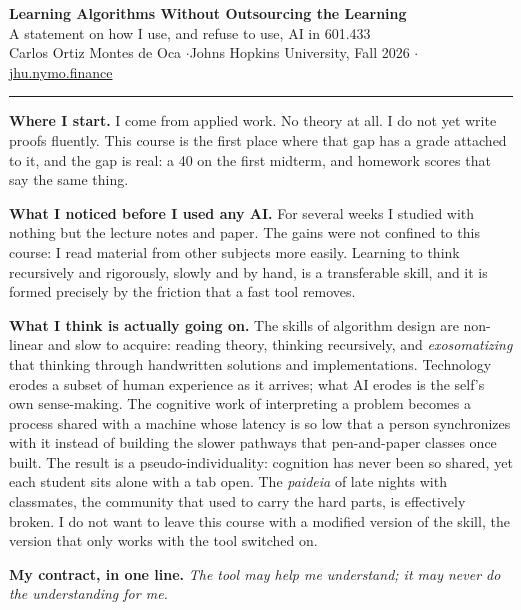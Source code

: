 \documentclass[10pt,letterpaper]{article}
\begin{document}
\begin{center}
{\LARGE\bfseries Learning Algorithms Without Outsourcing the Learning}\\[2pt]
{\large A statement on how I use, and refuse to use, AI in 601.433}\\[4pt]
{\small Carlos Ortiz Montes de Oca \quad$\cdot$\quad Johns Hopkins University, Fall 2026 \quad$\cdot$\quad \href{https://jhu.nymo.finance}{jhu.nymo.finance}}
\end{center}
\vspace{2pt}\hrule\vspace{8pt}

\textbf{Where I start.} I come from applied work. No theory at all. I do not yet write proofs fluently. This course is the first place where that gap has a grade attached to it, and the gap is real: a 40 on the first midterm, and homework scores that say the same thing.

\textbf{What I noticed before I used any AI.} For several weeks I studied with nothing but the lecture notes and paper. The gains were not confined to this course: I read material from other subjects more easily. Learning to think recursively and rigorously, slowly and by hand, is a transferable skill, and it is formed precisely by the friction that a fast tool removes.

\textbf{What I think is actually going on.} The skills of algorithm design are non-linear and slow to acquire: reading theory, thinking recursively, and \emph{exosomatizing} that thinking through handwritten solutions and implementations. Technology erodes a subset of human experience as it arrives; what AI erodes is the self's own sense-making. The cognitive work of interpreting a problem becomes a process shared with a machine whose latency is so low that a person synchronizes with it instead of building the slower pathways that pen-and-paper classes once built. The result is a pseudo-individuality: cognition has never been so shared, yet each student sits alone with a tab open. The \emph{paideia} of late nights with classmates, the community that used to carry the hard parts, is effectively broken. I do not want to leave this course with a modified version of the skill, the version that only works with the tool switched on.

\textbf{My contract, in one line.} \emph{The tool may help me understand; it may never do the understanding for me.}
\end{document}
